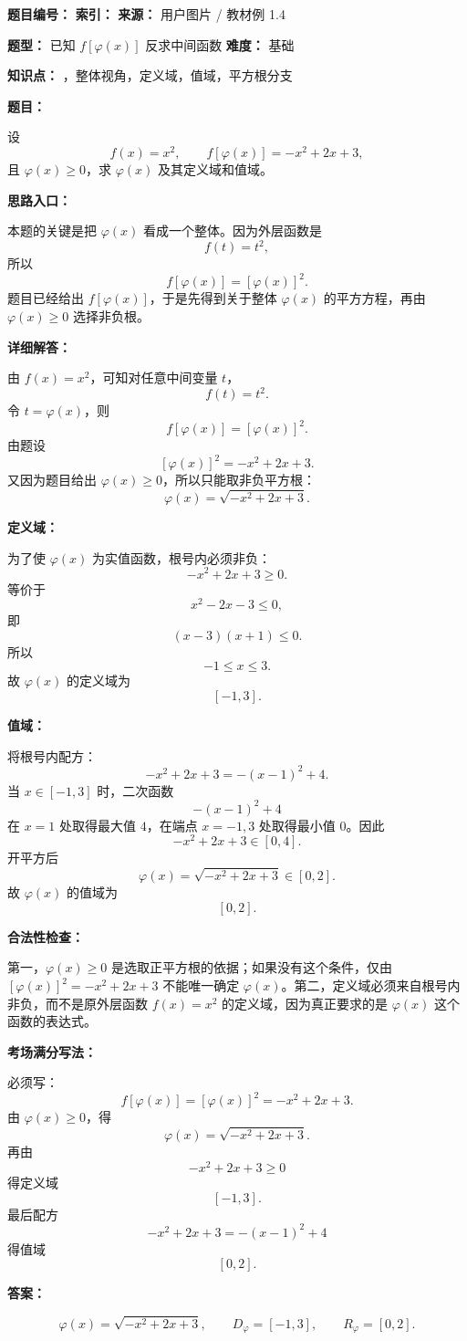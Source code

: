 \begin{problemBox}
\begin{problemMeta}
\textbf{题目编号：}  \quad
\textbf{索引：}  \quad
\textbf{来源：} 用户图片 / 教材例 1.4

\textbf{题型：} 已知 \(f[\varphi(x)]\) 反求中间函数 \quad
\textbf{难度：} 基础

\textbf{知识点：} ，整体视角，定义域，值域，平方根分支
\end{problemMeta}

\textbf{题目：}

设
\[
f(x)=x^2,\qquad f[\varphi(x)]=-x^2+2x+3,
\]
且 \(\varphi(x)\ge 0\)，求 \(\varphi(x)\) 及其定义域和值域。
\end{problemBox}

\begin{solutionBox}
\textbf{思路入口：}

本题的关键是把 \(\varphi(x)\) 看成一个整体。因为外层函数是
\[
f(t)=t^2,
\]
所以
\[
f[\varphi(x)]=[\varphi(x)]^2.
\]
题目已经给出 \(f[\varphi(x)]\)，于是先得到关于整体 \(\varphi(x)\) 的平方方程，再由 \(\varphi(x)\ge 0\) 选择非负根。

\textbf{详细解答：}

由 \(f(x)=x^2\)，可知对任意中间变量 \(t\)，
\[
f(t)=t^2.
\]
令 \(t=\varphi(x)\)，则
\[
f[\varphi(x)]=[\varphi(x)]^2.
\]
由题设
\[
[\varphi(x)]^2=-x^2+2x+3.
\]
又因为题目给出 \(\varphi(x)\ge 0\)，所以只能取非负平方根：
\[
\varphi(x)=\sqrt{-x^2+2x+3}.
\]

\textbf{定义域：}

为了使 \(\varphi(x)\) 为实值函数，根号内必须非负：
\[
-x^2+2x+3\ge 0.
\]
等价于
\[
x^2-2x-3\le 0,
\]
即
\[
(x-3)(x+1)\le 0.
\]
所以
\[
-1\le x\le 3.
\]
故 \(\varphi(x)\) 的定义域为
\[
[-1,3].
\]

\textbf{值域：}

将根号内配方：
\[
-x^2+2x+3=-(x-1)^2+4.
\]
当 \(x\in[-1,3]\) 时，二次函数
\[
-(x-1)^2+4
\]
在 \(x=1\) 处取得最大值 \(4\)，在端点 \(x=-1,3\) 处取得最小值 \(0\)。因此
\[
-x^2+2x+3\in[0,4].
\]
开平方后
\[
\varphi(x)=\sqrt{-x^2+2x+3}\in[0,2].
\]
故 \(\varphi(x)\) 的值域为
\[
[0,2].
\]

\textbf{合法性检查：}

第一，\(\varphi(x)\ge 0\) 是选取正平方根的依据；如果没有这个条件，仅由 \([\varphi(x)]^2=-x^2+2x+3\) 不能唯一确定 \(\varphi(x)\)。第二，定义域必须来自根号内非负，而不是原外层函数 \(f(x)=x^2\) 的定义域，因为真正要求的是 \(\varphi(x)\) 这个函数的表达式。

\textbf{考场满分写法：}

必须写：
\[
f[\varphi(x)]=[\varphi(x)]^2=-x^2+2x+3.
\]
由 \(\varphi(x)\ge 0\)，得
\[
\varphi(x)=\sqrt{-x^2+2x+3}.
\]
再由
\[
-x^2+2x+3\ge 0
\]
得定义域
\[
[-1,3].
\]
最后配方
\[
-x^2+2x+3=-(x-1)^2+4
\]
得值域
\[
[0,2].
\]

\textbf{答案：}

\[
\boxed{\varphi(x)=\sqrt{-x^2+2x+3},\qquad D_\varphi=[-1,3],\qquad R_\varphi=[0,2].}
\]
\end{solutionBox}

